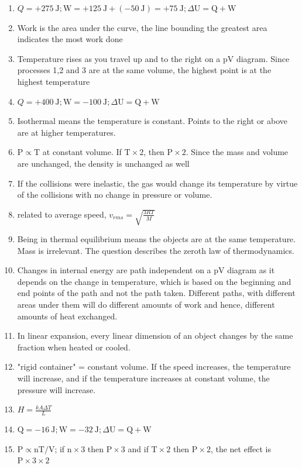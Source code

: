 \begin{enumerate}
\begin{enumerate}
  \item $Q=+275 \mathrm{~J} ; \mathrm{W}=+125 \mathrm{~J}+(-50 \mathrm{~J})=+75 \mathrm{~J} ; \Delta \mathrm{U}=\mathrm{Q}+\mathrm{W}$
  \item Work is the area under the curve, the line bounding the greatest area indicates the most work done
  \item Temperature rises as you travel up and to the right on a pV diagram. Since processes 1,2 and 3 are at the same volume, the highest point is at the highest temperature
  \item $Q=+400 \mathrm{~J} ; \mathrm{W}=-100 \mathrm{~J} ; \Delta \mathrm{U}=\mathrm{Q}+\mathrm{W}$
  \item Isothermal means the temperature is constant. Points to the right or above are at higher temperatures.
  \item $\mathrm{P} \propto \mathrm{T}$ at constant volume. If $\mathrm{T} \times 2$, then $\mathrm{P} \times 2$. Since the mass and volume are unchanged, the density is unchanged as well
  \item If the collisions were inelastic, the gas would change its temperature by virtue of the collisions with no change in pressure or volume.
  \item related to average speed, $v_{r m s}=\sqrt{\frac{3 R T}{M}}$
  \item Being in thermal equilibrium means the objects are at the same temperature. Mass is irrelevant. The question describes the zeroth law of thermodynamics.
  \item Changes in internal energy are path independent on a pV diagram as it depends on the change in temperature, which is based on the beginning and end points of the path and not the path taken. Different paths, with different areas under them will do different amounts of work and hence, different amounts of heat exchanged.
  \item In linear expansion, every linear dimension of an object changes by the same fraction when heated or cooled.
  \item "rigid container" = constant volume. If the speed increases, the temperature will increase, and if the temperature increases at constant volume, the pressure will increase.
  \item $H=\frac{k A \Delta T}{L}$
  \item $\mathrm{Q}=-16 \mathrm{~J} ; \mathrm{W}=-32 \mathrm{~J} ; \Delta \mathrm{U}=\mathrm{Q}+\mathrm{W}$
  \item $\mathrm{P} \propto \mathrm{nT} / \mathrm{V}$; if $\mathrm{n} \times 3$ then $\mathrm{P} \times 3$ and if $\mathrm{T} \times 2$ then $\mathrm{P} \times 2$, the net effect is $\mathrm{P} \times 3 \times 2$

\end{enumerate}
\end{enumerate}
